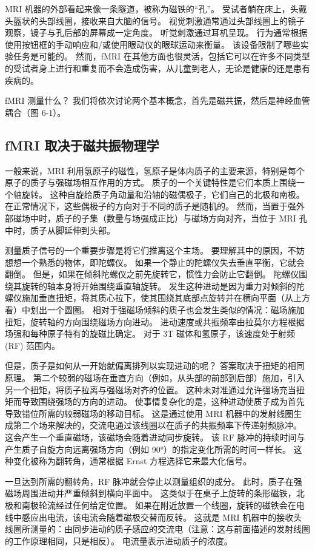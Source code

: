 MRI 机器的外部看起来像一条隧道，被称为磁铁的“孔”。 受试者躺在床上，头戴头盔状的头部线圈，接收来自大脑的信号。 视觉刺激通常通过头部线圈上的镜子观察，镜子与孔后部的屏幕成一定角度。 听觉刺激通过耳机呈现。 行为通常根据使用按钮框的手动响应和/或使用眼动仪的眼球运动来衡量。 该设备限制了哪些实验任务是可能的。 然而，fMRI 在其他方面也很灵活，包括它可以在许多不同类型的受试者身上进行和重复而不会造成伤害，从儿童到老人，无论是健康的还是患有疾病的。

fMRI 测量什么？ 我们将依次讨论两个基本概念，首先是磁共振，然后是神经血管耦合（图 6-1）。

\subsection{fMRI 取决于磁共振物理学}
一般来说，MRI 利用氢原子的磁性，氢原子是体内质子的主要来源，特别是每个原子的质子与强磁场相互作用的方式。 质子的一个关键特性是它们本质上围绕一个轴旋转。 这种自旋给质子角动量和沿轴的磁偶极子，它们自己的北极和南极。 在正常情况下，这些偶极子的方向对于不同的质子是随机的。 然而，当置于强外部磁场中时，质子的子集（数量与场强成正比）与磁场方向对齐，当位于 MRI 孔中时，质子从脚延伸到头部。

测量质子信号的一个重要步骤是将它们推离这个主场。 要理解其中的原因，不妨想想一个熟悉的物体，即陀螺仪。 如果一个静止的陀螺仪失去垂直平衡，它就会翻倒。 但是，如果在倾斜陀螺仪之前先旋转它，惯性力会防止它翻倒。 陀螺仪围绕其旋转的轴本身将开始围绕垂直轴旋转。 发生这种进动是因为重力对倾斜的陀螺仪施加垂直扭矩，将其质心拉下，使其围绕其底部点旋转并在横向平面（从上方看）中划出一个圆圈。 相对于强磁场倾斜的质子也会发生类似的情况：磁场施加扭矩，旋转轴的方向围绕磁场方向进动。 进动速度或共振频率由拉莫尔方程根据场强和每种原子特有的旋磁比确定。 对于 3T 磁体和氢原子，该速度处于射频 (RF) 范围内。

但是，质子是如何从一开始就偏离排列以实现进动的呢？ 答案取决于扭矩的相同原理。 第二个较弱的磁场在垂直方向（例如，从头部的前部到后部）施加，引入另一个扭矩，将质子拉离与强磁场对齐的位置。 这种未对准通过允许强场充当扭矩而导致围绕强场的方向的进动。 使事情复杂化的是，这种进动使质子成为首先导致错位所需的较弱磁场的移动目标。 这是通过使用 MRI 机器中的发射线圈生成第二个场来解决的，交流电通过该线圈以在质子的共振频率下传递射频脉冲。 这会产生一个垂直磁场，该磁场会随着进动同步旋转。 该 RF 脉冲的持续时间与产生质子自旋方向远离强场方向（例如 90°）的指定变化所需的时间一样长。 这种变化被称为翻转角，通常根据 Ernst 方程选择它来最大化信号。

一旦达到所需的翻转角，RF 脉冲就会停止以测量组织的成分。 此时，质子在强磁场周围进动并严重倾斜到横向平面中。 这类似于在桌子上旋转的条形磁铁，北极和南极轮流经过任何给定位置。 如果在附近放置一个线圈，旋转的磁铁会在电线中感应出电流，该电流会随着磁极交替而反转。 这就是 MRI 机器中的接收头线圈所测量的：由同步进动的质子感应的交流电（注意：这与前面描述的发射线圈的工作原理相同，只是相反）。 电流量表示进动质子的浓度。

